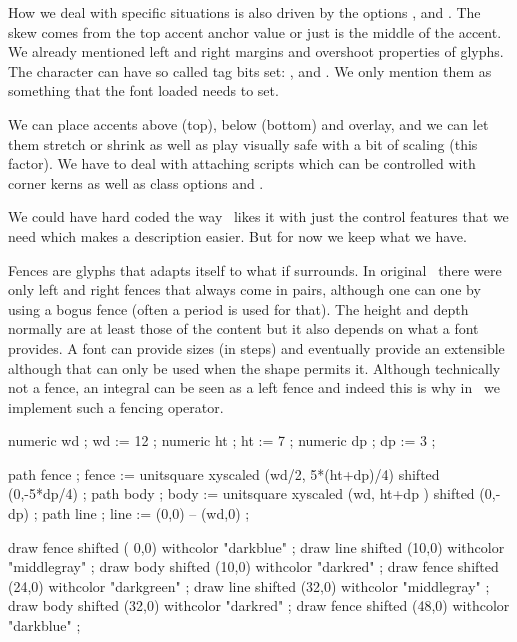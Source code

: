 How we deal with specific situations is also driven by the 
options ,  and
. The skew comes from the top accent anchor value or
just is the middle of the accent. We already mentioned left and right margins and
overshoot properties of glyphs. The character can have so called tag bits set:
,  and . We only
mention them as something that the font loaded needs to set.

We can place accents above (top), below (bottom) and overlay, and we can let them
stretch or shrink as well as play visually safe with a bit of scaling (this
factor). We have to deal with attaching scripts which can be controlled with
corner kerns as well as class options  and .

We could have hard coded the way \CONTEXT\ likes it with just the control
features that we need which makes a description easier. But for now we keep what
we have.

\stopsection

\startsection[title=Math fences]

Fences are glyphs that adapts itself to what if surrounds. In original \TEX\
there were only left and right fences that always come in pairs, although one can
\quote {hide} one by using a bogus fence (often a period is used for that). The
height and depth normally are at least those of the content but it also depends
on what a font provides. A font can provide sizes (in steps) and eventually
provide an extensible although that can only be used when the shape permits it.
Although technically not a fence, an integral can be seen as a left fence and
indeed this is why in \LUAMETATEX\ we implement such a fencing operator.

\startlinecorrection
\startMPcode
    numeric wd ; wd := 12 ;
    numeric ht ; ht :=  7 ;
    numeric dp ; dp :=  3 ;

    path fence ; fence := unitsquare xyscaled (wd/2, 5*(ht+dp)/4) shifted (0,-5*dp/4) ;
    path body  ; body  := unitsquare xyscaled (wd,      ht+dp   ) shifted (0,-dp) ;
    path line  ; line  := (0,0) -- (wd,0) ;

    draw fence shifted ( 0,0) withcolor "darkblue" ;
    draw line  shifted (10,0) withcolor "middlegray" ;
    draw body  shifted (10,0) withcolor "darkred" ;
    draw fence shifted (24,0) withcolor "darkgreen" ;
    draw line  shifted (32,0) withcolor "middlegray" ;
    draw body  shifted (32,0) withcolor "darkred" ;
    draw fence shifted (48,0) withcolor "darkblue" ;

